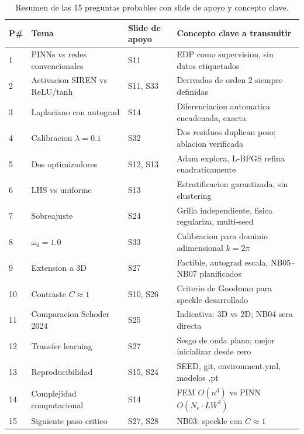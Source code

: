 \begin{table}[h!]
\centering
\small
\begin{tabular}{llll}
\toprule
\textbf{P\#} & \textbf{Tema} & \textbf{Slide de apoyo} & \textbf{Concepto clave a transmitir} \\
\midrule
1 & PINNs vs redes convencionales & S11 & EDP como supervision, sin datos etiquetados \\
2 & Activacion SIREN vs ReLU/tanh & S11, S33 & Derivadas de orden 2 siempre definidas \\
3 & Laplaciano con autograd & S14 & Diferenciacion automatica encadenada, exacta \\
4 & Calibracion $\lambda = 0.1$ & S32 & Dos residuos duplican peso; ablacion verificada \\
5 & Dos optimizadores & S12, S13 & Adam explora, L-BFGS refina cuadraticamente \\
6 & LHS vs uniforme & S13 & Estratificacion garantizada, sin clustering \\
7 & Sobreajuste & S24 & Grilla independiente, fisica regulariza, multi-seed \\
8 & $\omega_0 = 1.0$ & S33 & Calibracion para dominio adimensional $k=2\pi$ \\
9 & Extension a 3D & S27 & Factible, autograd escala, NB05--NB07 planificados \\
10 & Contraste $C \approx 1$ & S10, S26 & Criterio de Goodman para speckle desarrollado \\
11 & Comparacion Schoder 2024 & S25 & Indicativa: 3D vs 2D; NB04 sera directa \\
12 & Transfer learning & S27 & Sesgo de onda plana; mejor inicializar desde cero \\
13 & Reproducibilidad & S15, S24 & SEED, git, environment.yml, modelos .pt \\
14 & Complejidad computacional & S14 & FEM $O(n^3)$ vs PINN $O(N_c \cdot LW^2)$ \\
15 & Siguiente paso critico & S27, S28 & NB03: speckle con $C \approx 1$ \\
\bottomrule
\end{tabular}
\caption{Resumen de las 15 preguntas probables con slide de apoyo y concepto clave.}
\end{table}
